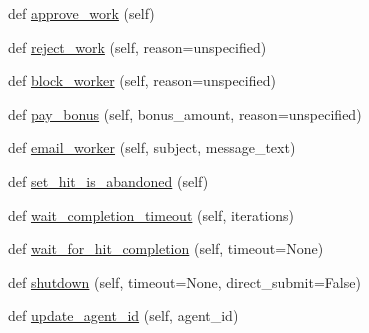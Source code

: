 \begin{DoxyCompactItemize}
\item 
def \hyperlink{classparlai_1_1mturk_1_1core_1_1agents_1_1MTurkAgent_a5dad7b198d999ce61833a8b255b5f6d3}{approve\+\_\+work} (self)
\item 
def \hyperlink{classparlai_1_1mturk_1_1core_1_1agents_1_1MTurkAgent_a88473ff128e7a40c59711d35eab97a0b}{reject\+\_\+work} (self, reason=\textquotesingle{}unspecified\textquotesingle{})
\item 
def \hyperlink{classparlai_1_1mturk_1_1core_1_1agents_1_1MTurkAgent_a3c836286ed2f5fedce11c410a437208c}{block\+\_\+worker} (self, reason=\textquotesingle{}unspecified\textquotesingle{})
\item 
def \hyperlink{classparlai_1_1mturk_1_1core_1_1agents_1_1MTurkAgent_afdcfa4b074f379039112935c65463a40}{pay\+\_\+bonus} (self, bonus\+\_\+amount, reason=\textquotesingle{}unspecified\textquotesingle{})
\item 
def \hyperlink{classparlai_1_1mturk_1_1core_1_1agents_1_1MTurkAgent_a5bd91f1939122df606623b61c0467976}{email\+\_\+worker} (self, subject, message\+\_\+text)
\item 
def \hyperlink{classparlai_1_1mturk_1_1core_1_1agents_1_1MTurkAgent_a71115b83b70d4730c54e61837846d914}{set\+\_\+hit\+\_\+is\+\_\+abandoned} (self)
\item 
def \hyperlink{classparlai_1_1mturk_1_1core_1_1agents_1_1MTurkAgent_a16eafd62a6d60317de9098405f786180}{wait\+\_\+completion\+\_\+timeout} (self, iterations)
\item 
def \hyperlink{classparlai_1_1mturk_1_1core_1_1agents_1_1MTurkAgent_a562fdfdb24a4e2274d45bd4a7aa7cfff}{wait\+\_\+for\+\_\+hit\+\_\+completion} (self, timeout=None)
\item 
def \hyperlink{classparlai_1_1mturk_1_1core_1_1agents_1_1MTurkAgent_ad269775afaaa10dba0432080fba99b14}{shutdown} (self, timeout=None, direct\+\_\+submit=False)
\item 
def \hyperlink{classparlai_1_1mturk_1_1core_1_1agents_1_1MTurkAgent_a5d4b1243830669cf21676d878045d5a9}{update\+\_\+agent\+\_\+id} (self, agent\+\_\+id)
\end{DoxyCompactItemize}
